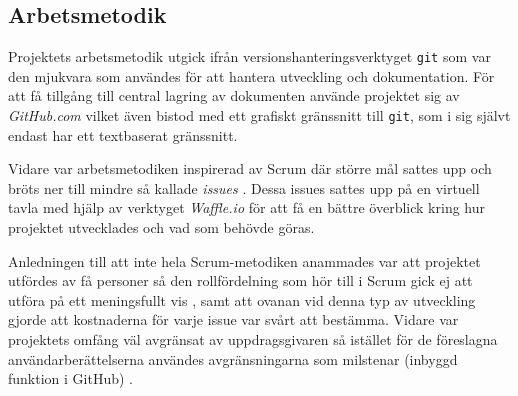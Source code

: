 
    \newpage

    \subsection{Arbetsmetodik} %
    \label{sub:arbetsmetodik}
        Projektets arbetsmetodik utgick ifrån versionshanteringsverktyget \texttt{git} 
        som var den mjukvara som användes för att hantera utveckling och dokumentation. För att få tillgång 
        till central lagring av dokumenten använde projektet sig av \textit{GitHub.com} vilket även bistod med ett grafiskt gränssnitt till \texttt{git}, som i sig självt endast har ett textbaserat gränssnitt. \bigskip

        Vidare var arbetsmetodiken inspirerad av Scrum där större mål sattes upp och bröts ner till mindre så kallade \textit{issues} \cite[kap.~8]{scrum}. Dessa issues sattes upp på en virtuell tavla med hjälp av verktyget \textit{Waffle.io} för att få en bättre överblick kring hur projektet utvecklades och vad som behövde göras. \bigskip

        Anledningen till att inte hela Scrum-metodiken anammades var att projektet utfördes av få personer så den rollfördelning som hör till i Scrum gick ej att utföra på ett meningsfullt vis \cite[kap.~6]{scrum}, samt att ovanan vid denna typ av utveckling gjorde att kostnaderna för varje issue var svårt att bestämma. Vidare var projektets omfång väl avgränsat av uppdrags\-givaren så istället för de föreslagna användarberättelserna användes avgränsningarna som milstenar (inbyggd funktion i GitHub) \cite[kap.~9]{scrum}.


